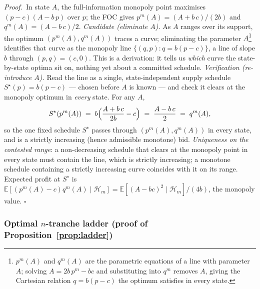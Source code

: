 \documentclass[11pt,a4paper]{article}
\theoremstyle{definition}
\theoremstyle{remark}
\theoremstyle{plain}
\begin{document}
\noindent\textit{Proof.}\ In state $A$, the full-information monopoly point maximises $(p - c)(A - b\,p)$ over $p$; the FOC gives $p^m(A) = (A + b\,c)/(2 b)$ and $q^m(A) = (A - b\,c)/2$. \emph{Candidate (eliminate $A$).} As $A$ ranges over its support, the optimum $(p^m(A), q^m(A))$ traces a curve; eliminating the parameter $A$\footnote{$p^m(A)$ and $q^m(A)$ are the parametric equations of a line with parameter $A$; solving $A = 2b\,p^m - bc$ and substituting into $q^m$ removes $A$, giving the Cartesian relation $q = b(p-c)$ the optimum satisfies in every state.} identifies that curve as the monopoly line $\{(q, p) : q = b(p - c)\}$, a line of slope $b$ through $(p, q) = (c, 0)$. This is a derivation: it tells us \emph{which} curve the state-by-state optima sit on, nothing yet about a committed schedule. \emph{Verification (re-introduce $A$).} Read the line as a single, state-independent supply schedule $S^\star(p) = b(p - c)$ --- chosen before $A$ is known --- and check it clears at the monopoly optimum in \emph{every} state. For any $A$,
\[
S^\star(p^m(A)) \;=\; b\Bigl(\frac{A + b\,c}{2 b} - c\Bigr) \;=\; \frac{A - b\,c}{2} \;=\; q^m(A),
\]
so the one fixed schedule $S^\star$ passes through $(p^m(A), q^m(A))$ in every state, and is a strictly increasing (hence admissible monotone) bid. \emph{Uniqueness on the contested range}: a non-decreasing schedule that clears at the monopoly point in every state must contain the line, which is strictly increasing; a monotone schedule containing a strictly increasing curve coincides with it on its range. Expected profit at $S^\star$ is $\mathbb{E}[(p^m(A) - c) q^m(A) \mid \mathcal{H}_m] = \mathbb{E}[(A - b c)^2 \mid \mathcal{H}_m]/(4 b)$, the monopoly value. $\square$

\subsubsection{Optimal $n$-tranche ladder (proof of Proposition~\ref{prop:ladder})}\label{app:tranche:quantizer}
\end{document}
